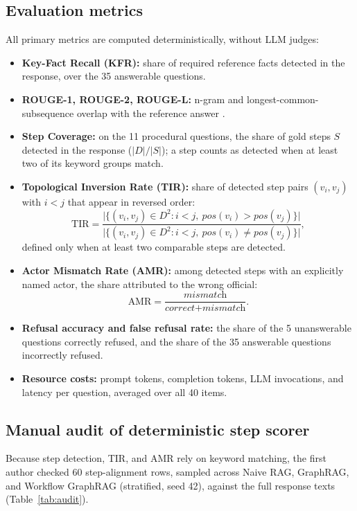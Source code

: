 \documentclass[preprint,10pt]{elsarticle}
\begin{document}
\subsection{Evaluation metrics}
All primary metrics are computed deterministically, without LLM judges:
\begin{itemize}[leftmargin=*]
\item \textbf{Key-Fact Recall (KFR):} share of required reference facts detected in the response, over the 35 answerable questions.
\item \textbf{ROUGE-1, ROUGE-2, ROUGE-L:} n-gram and longest-common-subsequence overlap with the reference answer \cite{lin2004rouge}.
\item \textbf{Step Coverage:} on the 11 procedural questions, the share of gold steps $S$ detected in the response ($|D|/|S|$); a step counts as detected when at least two of its keyword groups match.
\item \textbf{Topological Inversion Rate (TIR):} share of detected step pairs $(v_i,v_j)$ with $i<j$ that appear in reversed order:
\begin{equation}
\text{TIR} = \frac{\bigl|\{(v_i,v_j) \in D^2 : i<j,\ \textit{pos}(v_i) > \textit{pos}(v_j)\}\bigr|}{\bigl|\{(v_i,v_j) \in D^2 : i<j,\ \textit{pos}(v_i) \neq \textit{pos}(v_j)\}\bigr|},
\end{equation}
defined only when at least two comparable steps are detected.
\item \textbf{Actor Mismatch Rate (AMR):} among detected steps with an explicitly named actor, the share attributed to the wrong official:
\begin{equation}
\text{AMR} = \frac{\textit{mismatch}}{\textit{correct} + \textit{mismatch}}.
\end{equation}
\item \textbf{Refusal accuracy and false refusal rate:} the share of the 5 unanswerable questions correctly refused, and the share of the 35 answerable questions incorrectly refused.
\item \textbf{Resource costs:} prompt tokens, completion tokens, LLM invocations, and latency per question, averaged over all 40 items.
\end{itemize}

\subsection{Manual audit of deterministic step scorer}
\label{sec:audit}
Because step detection, TIR, and AMR rely on keyword matching, the first author checked 60 step-alignment rows, sampled across Naive RAG, GraphRAG, and Workflow GraphRAG (stratified, seed 42), against the full response texts (Table~\ref{tab:audit}).
\end{document}
